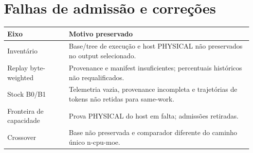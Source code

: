 \clearpage
\section{Falhas de admissão e correções}
\begin{tabularx}{\linewidth}{@{}p{33mm}Y@{}}
\toprule \textbf{Eixo} & \textbf{Motivo preservado}\\ \midrule
Inventário & Base/tree de execução e host PHYSICAL não preservados no output selecionado.\\
Replay byte-weighted & Provenance e manifest insuficientes; percentuais históricos não requalificados.\\
Stock B0/B1 & Telemetria vazia, provenance incompleta e trajetórias de tokens não retidas para same-work.\\
Fronteira de capacidade & Prova PHYSICAL do host em falta; admissões retiradas.\\
Crossover & Base não preservada e comparador diferente do caminho único n-cpu-moe.\\
\bottomrule
\end{tabularx}


